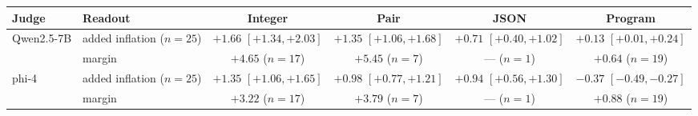 \begin{tabular}{llcccc}
\toprule
Judge & Readout & Integer & Pair & JSON & Program \\
\midrule
Qwen2.5-7B & added inflation ($n{=}25$) & $+1.66$ {\scriptsize$[+1.34,+2.03]$} & $+1.35$ {\scriptsize$[+1.06,+1.68]$} & $+0.71$ {\scriptsize$[+0.40,+1.02]$} & $+0.13$ {\scriptsize$[+0.01,+0.24]$} \\
 & margin & $+4.65$ {\scriptsize($n{=}17$)} & $+5.45$ {\scriptsize($n{=}7$)} & --- {\scriptsize($n{=}1$)} & $+0.64$ {\scriptsize($n{=}19$)} \\
phi-4 & added inflation ($n{=}25$) & $+1.35$ {\scriptsize$[+1.06,+1.65]$} & $+0.98$ {\scriptsize$[+0.77,+1.21]$} & $+0.94$ {\scriptsize$[+0.56,+1.30]$} & $-0.37$ {\scriptsize$[-0.49,-0.27]$} \\
 & margin & $+3.22$ {\scriptsize($n{=}17$)} & $+3.79$ {\scriptsize($n{=}7$)} & --- {\scriptsize($n{=}1$)} & $+0.88$ {\scriptsize($n{=}19$)} \\
\bottomrule
\end{tabular}
